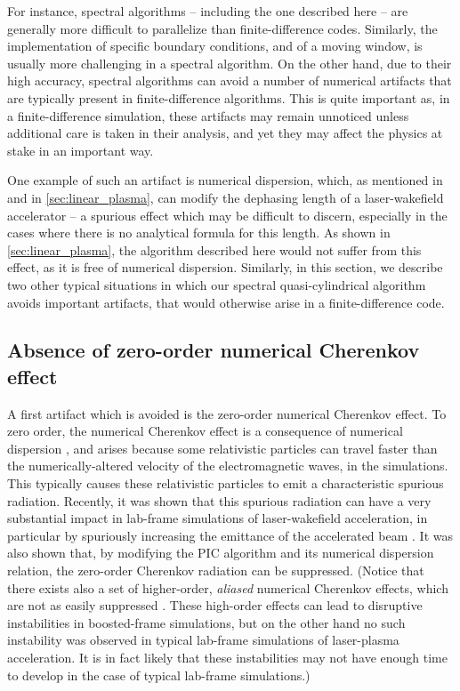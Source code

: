 \documentclass[1p,times]{elsarticle}
\begin{document}
For instance, spectral algorithms -- including the one described here
-- are generally more difficult to parallelize than finite-difference
codes. Similarly, the implementation of specific boundary
conditions, and of a moving window, is usually more challenging in a
spectral algorithm. On the other hand, due to their high accuracy,
spectral algorithms can avoid a
number of numerical artifacts that are typically present in
finite-difference algorithms. This is quite important as, in a
finite-difference simulation, these artifacts may remain unnoticed
unless additional care is taken in their analysis, and yet they may
affect the physics at stake in an important way.

One example of such an artifact is numerical dispersion, which, as
mentioned in \citep{CowanPRSTAB2013} and in \cref{sec:linear_plasma}, 
can modify the dephasing length of a laser-wakefield accelerator -- a
spurious effect which
may be difficult to discern, especially in the cases where there is no
analytical formula for this length. As shown in
\cref{sec:linear_plasma}, the algorithm described here would not suffer
from this effect, as it is free of numerical dispersion. Similarly, in
this section, we describe two other typical situations in which our spectral
quasi-cylindrical algorithm avoids important artifacts, that would otherwise
arise in a finite-difference code. 

\subsection{Absence of zero-order numerical Cherenkov effect}

A first artifact which is avoided is the zero-order numerical
Cherenkov effect. To zero order, the numerical Cherenkov effect is a 
consequence of numerical dispersion \citep{GodfreyJCP1974}, and arises 
because some relativistic particles can
travel faster than the numerically-altered velocity of the
electromagnetic waves, in the simulations. This typically causes these
relativistic particles to emit a characteristic spurious
radiation. Recently, it was shown that this spurious radiation
can have a very substantial impact in
lab-frame simulations of laser-wakefield acceleration, 
in particular by spuriously increasing the
emittance of the accelerated beam \citep{LehePRSTAB2013}. It
was also shown that, by modifying the PIC algorithm and its
numerical dispersion relation, the zero-order Cherenkov radiation can be
suppressed. (Notice that there exists also a set of higher-order,
\emph{aliased} numerical Cherenkov effects, which are not as easily
suppressed \citep{GodfreyJCP2013,XuCPC2013,GodfreyJCP2014,
GodfreyIEEE2014,YuJCP2014,YuCPC2015,GodfreyCPC2015}. 
These high-order effects can lead to
disruptive instabilities in boosted-frame simulations, but on the
other hand no such instability was observed in typical lab-frame
simulations of laser-plasma acceleration. 
It is in fact likely that these instabilities may not have enough time to
develop in the case of typical lab-frame simulations.) 
\end{document}
